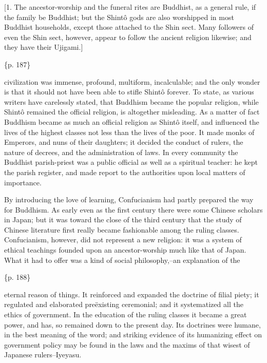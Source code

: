 [1. The ancestor-worship and the funeral rites are Buddhist, as a general rule, if the family be Buddhist; but the Shintô gods are also worshipped in most Buddhist households, except those attached to the Shin sect. Many followers of even the Shin sect, however, appear to follow the ancient religion likewise; and they have their Ujigami.]

\{p. 187\}

civilization was immense, profound, multiform, incalculable; and the only wonder is that it should not have been able to stifle Shintô forever. To state, as various writers have carelessly stated, that Buddhism became the popular religion, while Shintô remained the official religion, is altogether misleading. As a matter of fact Buddhism became as much an official religion as Shintô itself, and influenced the lives of the highest classes not less than the lives of the poor. It made monks of Emperors, and nuns of their daughters; it decided the conduct of rulers, the nature of decrees, and the administration of laws. In every community the Buddhist parish-priest was a public official as well as a spiritual teacher: he kept the parish register, and made report to the authorities upon local matters of importance.



By introducing the love of learning, Confucianism had partly prepared the way for Buddhism. As early even as the first century there were some Chinese scholars in Japan; but it was toward the close of the third century that the study of Chinese literature first really became fashionable among the ruling classes. Confucianism, however, did not represent a new religion: it was a system of ethical teachings founded upon an ancestor-worship much like that of Japan. What it had to offer was a kind of social philosophy,--an explanation of the

\{p. 188\}

eternal reason of things. It reinforced and expanded the doctrine of filial piety; it regulated and elaborated preëxisting ceremonial; and it systematized all the ethics of government. In the education of the ruling classes it became a great power, and has, so remained down to the present day. Its doctrines were humane, in the best meaning of the word; and striking evidence of its humanizing effect on government policy may be found in the laws and the maxims of that wisest of Japanese rulers--Iyeyasu.

